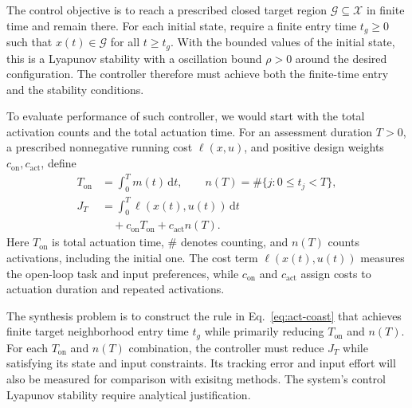 \documentclass[letterpaper,10pt,conference]{ieeeconf}
\newcommand{\dd}{\mathrm{d}}
\begin{document}
The control objective is to reach a prescribed closed target region $\mathcal G\subseteq\mathcal X$ in finite time and remain there. For each initial state, require a finite entry time $t_g\ge0$ such that $x(t)\in\mathcal G$ for all $t\ge t_g$. With the bounded values of the initial state, this is a Lyapunov stability with a oscillation bound $\rho>0$ around the desired configuration.
The controller therefore must achieve both the finite-time entry and the stability conditions.

To evaluate performance of such controller, we would start with the total activation counts and the total actuation time.
For an assessment duration $T>0$, a prescribed nonnegative running cost $\ell(x,u)$, and positive design weights $c_{\mathrm{on}},c_{\mathrm{act}}$, define
\begin{equation}
\begin{aligned}
 T_{\mathrm{on}}&=\int_0^T m(t)\,\dd t,\qquad
 n(T)=\#\{j:0\le t_j<T\},\\
 J_T&=\int_0^T\ell(x(t),u(t))\,\dd t\\
 &\quad+c_{\mathrm{on}}T_{\mathrm{on}}+c_{\mathrm{act}}n(T).
\end{aligned}
\label{eq:act-coast-cost}
\end{equation}
Here $T_{\mathrm{on}}$ is total actuation time, $\#$ denotes counting, and $n(T)$ counts activations, including the initial one. The cost term $\ell(x(t),u(t))$ measures the open-loop task and input preferences, while $c_{\mathrm{on}}$ and $c_{\mathrm{act}}$ assign costs to actuation duration and repeated activations.

The synthesis problem is to construct the rule in Eq.~\eqref{eq:act-coast} that achieves finite target neighborhood entry time $t_g$ while primarily reducing $T_{\mathrm{on}}$ and $n(T)$. For each $T_{\mathrm{on}}$ and $n(T)$ combination, the controller must reduce $J_T$ while satisfying its state and input constraints.
Its tracking error and input effort will also be measured for comparison with exisitng methods. 
The system's control Lyapunov stability require analytical justification.
\end{document}
